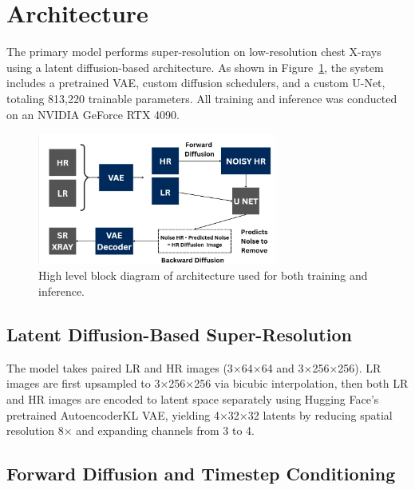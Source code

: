 \documentclass{article} %
\begin{document}
\section{Architecture}

The primary model performs super-resolution on low-resolution chest X-rays using a latent diffusion-based architecture. As shown in Figure~\ref{model2}, the system includes a pretrained VAE, custom diffusion schedulers, and a custom U-Net, totaling 813,220 trainable parameters. All training and inference was conducted on an NVIDIA GeForce RTX 4090.

\begin{figure}[h]
\begin{center}
\includegraphics[width=0.7\textwidth]{progress/Figs/model2.jpg}
\end{center}
\caption{High level block diagram of architecture used for both training and inference.}
\label{model2}
\end{figure}

\subsection{Latent Diffusion-Based Super-Resolution}

The model takes paired LR and HR images (3×64×64 and 3×256×256). LR images are first upsampled to 3×256×256 via bicubic interpolation, then both LR and HR images are encoded to latent space separately using Hugging Face’s pretrained AutoencoderKL VAE, yielding 4×32×32 latents by reducing spatial resolution 8× and expanding channels from 3 to 4.

\subsection{Forward Diffusion and Timestep Conditioning}
\end{document}

